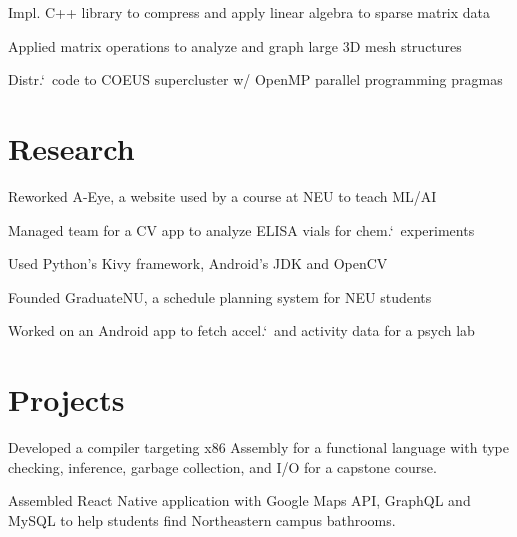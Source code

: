 \documentclass[letterpaper]{cv} %
\begin{document}
\begin{minipage}[t]{0.66\textwidth}
  \begin{tightitemize}
    \item Impl. C++ library to compress and apply linear algebra to sparse matrix data
    \item Applied matrix operations to analyze and graph large 3D mesh structures
    \item Distr.`\ code to COEUS supercluster w/ OpenMP parallel programming pragmas
  \end{tightitemize}

  \section{Research}


  \begin{tightitemize}
    \item Reworked A-Eye, a website used by a course at NEU to teach  ML/AI
    \item Managed team for a CV app to analyze ELISA vials for chem.`\ experiments
    \item Used Python's Kivy framework, Android's JDK and OpenCV
    \item Founded GraduateNU, a schedule planning system for NEU students
    \item Worked on an Android app to fetch accel.`\ and activity data for a psych lab
  \end{tightitemize}

  \section{Projects}

  Developed a compiler targeting x86 Assembly for a
  functional language with type checking, inference,
  garbage collection, and  I/O for a capstone course.
  \sectionspace

  Assembled React Native application with Google Maps API,
  GraphQL and MySQL to help students find Northeastern campus bathrooms.
  \sectionspace


\end{minipage}
\end{document}
